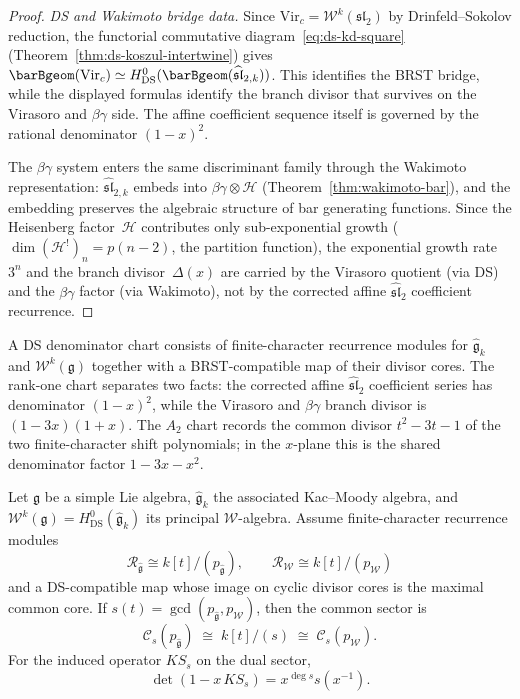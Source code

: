 \begin{proof}
\emph{DS and Wakimoto bridge data.}
Since $\mathrm{Vir}_c = \mathcal{W}^k(\mathfrak{sl}_2)$ by
Drinfeld--Sokolov reduction, the functorial commutative
diagram~\eqref{eq:ds-kd-square}
(Theorem~\ref{thm:ds-koszul-intertwine}) gives
$\barBgeom(\mathrm{Vir}_c) \simeq
H^0_{\mathrm{DS}}(\barBgeom(\widehat{\mathfrak{sl}}_{2,k}))$.
This identifies the BRST bridge, while the displayed formulas identify
the branch divisor that survives on the Virasoro and $\beta\gamma$
side.  The affine coefficient sequence itself is governed by the
rational denominator $(1-x)^2$.

The $\beta\gamma$ system enters the same discriminant family
through the Wakimoto representation:
$\widehat{\mathfrak{sl}}_{2,k}$ embeds into
$\beta\gamma \otimes \mathcal{H}$ (Theorem~\ref{thm:wakimoto-bar}),
and the embedding preserves the algebraic structure of bar
generating functions. Since the Heisenberg factor~$\mathcal{H}$
contributes only sub-exponential growth
($\dim (\mathcal{H}^!)_n = p(n{-}2)$, the partition function),
the exponential growth rate~$3^n$ and the branch divisor~$\Delta(x)$
are carried by the Virasoro quotient (via DS) and the $\beta\gamma$
factor (via Wakimoto), not by the corrected affine
$\widehat{\mathfrak{sl}}_2$ coefficient recurrence.
\end{proof}

\begin{remark}\label{rem:ds-discriminant-invariant}
A DS denominator chart consists of finite-character recurrence modules
for $\widehat{\mathfrak{g}}_k$ and $\mathcal{W}^k(\mathfrak{g})$
together with a BRST-compatible map of their divisor cores.  The
rank-one chart separates two facts: the corrected affine
$\widehat{\mathfrak{sl}}_2$ coefficient series has denominator
$(1-x)^2$, while the Virasoro and $\beta\gamma$ branch divisor is
$(1-3x)(1+x)$.  The $A_2$ chart records the common divisor
$t^2-3t-1$ of the two finite-character shift polynomials; in the
$x$-plane this is the shared denominator factor $1-3x-x^2$.
\end{remark}

\begin{theorem}
\label{thm:ds-spectral-branch-preservation}
Let $\mathfrak{g}$ be a simple Lie algebra,
$\widehat{\mathfrak{g}}_k$ the associated Kac--Moody algebra, and
$\mathcal{W}^k(\mathfrak{g}) = H^0_{\mathrm{DS}}(\widehat{\mathfrak{g}}_k)$
its principal $\mathcal{W}$-algebra.  Assume finite-character
recurrence modules
\[
\mathcal{R}_{\widehat{\mathfrak{g}}}\cong k[t]/(p_{\widehat{\mathfrak{g}}}),
\qquad
\mathcal{R}_{\mathcal{W}}\cong k[t]/(p_{\mathcal{W}})
\]
and a DS-compatible map whose image on cyclic divisor cores is the
maximal common core.  If
$s(t)=\gcd(p_{\widehat{\mathfrak{g}}},p_{\mathcal{W}})$, then the
common sector is
\[
\mathcal{C}_s(p_{\widehat{\mathfrak{g}}})
\;\cong\; k[t]/(s)
\;\cong\; \mathcal{C}_s(p_{\mathcal{W}}).
\]
For the induced operator $KS_s$ on the dual sector,
\[
\det(1-x\,KS_s)=x^{\deg s}s(x^{-1}).
\]
\end{theorem}

